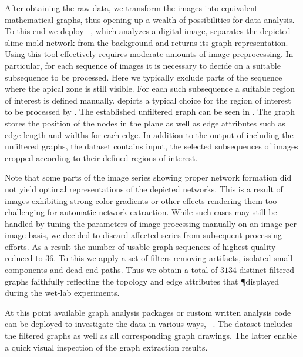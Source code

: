 	After obtaining the raw data, we transform the images into equivalent mathematical graphs, thus opening up a wealth of possibilities for data analysis. To this end we deploy \NEFI~\cite{dirnberger2015nefi}, which analyzes a digital image, separates the depicted slime mold network from the background and returns its graph representation. Using this tool effectively requires moderate amounts of image preprocessing. In particular, for each sequence of images it is necessary to decide on a suitable subsequence to be processed. Here we typically exclude parts of the sequence where the apical zone is still visible. For each such subsequence a suitable region of interest is defined manually.  depicts a typical choice for the region of interest to be processed by \NEFI. The established unfiltered graph can be seen in . The graph stores the position of the nodes in the plane as well as edge attributes such as edge length and widths for each edge. In addition to the output of \NEFI including the unfiltered graphs, the dataset contains \NEFIs input, \ie the selected subsequences of images cropped according to their defined regions of interest.

	Note that some parts of the image series showing proper network formation did not yield optimal representations of the depicted networks. This is a result of images exhibiting strong color gradients or other effects rendering them too challenging for automatic network extraction. While such cases may still be handled by tuning the parameters of image processing manually on an image per image basis, we decided to discard affected series from subsequent processing efforts. As a result the number of usable graph sequences of highest quality reduced to $36$. To this we apply a set of filters removing artifacts, isolated small components and dead-end paths. Thus we obtain a total of $3134$ distinct filtered graphs faithfully reflecting the topology and edge attributes that \P displayed during the wet-lab experiments. 

	At this point available graph analysis packages or custom written analysis code can be deployed to investigate the data in various ways, \eg~\cite{ICWSM09154,schult2008exploring}. The dataset includes the filtered graphs as well as all corresponding graph drawings. The latter enable a quick visual inspection of the graph extraction results.

